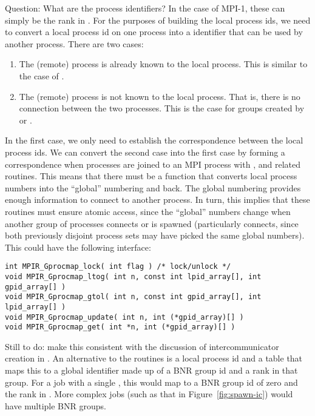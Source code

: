 \documentclass{article}
\begin{document}
Question: What are the process identifiers?  In the case of MPI-1, 
these can simply be the rank in .  For the
purposes of building the local process ids, we need to convert a local
process id on one process into a identifier that can be used by
another process.  There are two cases:
\begin{enumerate}
\item The (remote) process is already known to the local process.
This is similar to the case of .
\item The (remote) process is not known to the local process.  That
is, there is no connection between the two processes.  This is the
case for groups created by  or
. 
\end{enumerate}
In the first case, we only need to establish the correspondence
between the local process ids.  
We can convert the second case into the first case by forming a
correspondence when processes are joined to an MPI process with 
,  and related
routines.  This means that there must be a function that converts local
process numbers into the ``global'' numbering and back.  The global
numbering provides enough information to connect to another process.
In turn, this implies that these routines must ensure atomic access,
since the ``global'' numbers change when another group of processes
connects or is spawned (particularly connects, since both previously
disjoint process sets may have picked the same global numbers).
This could have the following
interface: 
\begin{verbatim}
int MPIR_Gprocmap_lock( int flag ) /* lock/unlock */
void MPIR_Gprocmap_ltog( int n, const int lpid_array[], int gpid_array[] )
void MPIR_Gprocmap_gtol( int n, const int gpid_array[], int lpid_array[] )
void MPIR_Gprocmap_update( int n, int (*gpid_array)[] )
void MPIR_Gprocmap_get( int *n, int (*gpid_array)[] )
\end{verbatim}

Still to do: make this consistent with the discussion of intercommunicator
creation in .  An alternative to the
 routines is a local process id and a table that
maps this to a global identifier made up of a BNR group id and a rank in that
group.  For a job with a single , this would map to a BNR
group id of zero and the rank in .  More complex jobs
(such as that in Figure~\ref{fig:spawn-ic}) would have multiple BNR groups.
\end{document}
